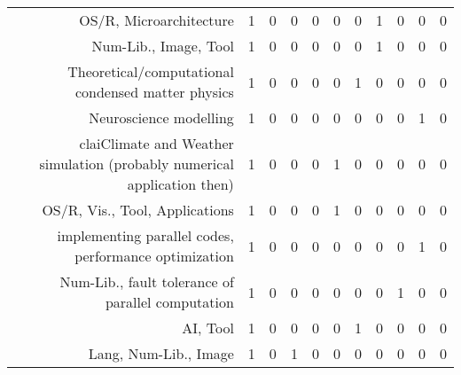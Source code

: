 {\begin{landscape}
\begin{longtable}[htb]{r|c|c|c|c|c|c|c|c|c|c}
{OS/R, Microarchitecture} & 1 & 0 & 0 & 0 & 0 & 0 & 1 & 0 & 0 & 0 \\%
{Num-Lib., Image, Tool} & 1 & 0 & 0 & 0 & 0 & 0 & 1 & 0 & 0 & 0 \\%
{Theoretical/computational condensed matter physics} & 1 & 0 & 0 & 0 & 0 & 1 & 0 & 0 & 0 & 0 \\%
{Neuroscience modelling} & 1 & 0 & 0 & 0 & 0 & 0 & 0 & 0 & 1 & 0 \\%
{claiClimate and Weather simulation (probably numerical application then)} & 1 & 0 & 0 & 0 & 1 & 0 & 0 & 0 & 0 & 0 \\%
{OS/R, Vis., Tool, Applications} & 1 & 0 & 0 & 0 & 1 & 0 & 0 & 0 & 0 & 0 \\%
{implementing parallel codes, performance optimization} & 1 & 0 & 0 & 0 & 0 & 0 & 0 & 0 & 1 & 0 \\%
{Num-Lib., fault tolerance of parallel computation} & 1 & 0 & 0 & 0 & 0 & 0 & 0 & 1 & 0 & 0 \\%
{AI, Tool} & 1 & 0 & 0 & 0 & 0 & 1 & 0 & 0 & 0 & 0 \\%
{Lang, Num-Lib., Image} & 1 & 0 & 1 & 0 & 0 & 0 & 0 & 0 & 0 & 0 \\%
\hline%
\end{longtable}%
\end{landscape}}%
\clearpage%
